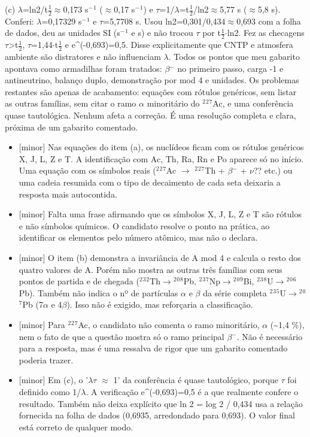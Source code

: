 \documentclass{article}%
\begin{document}
\newline%
(c) $\lambda$=ln2/t$\frac12$$\approx$0,173 s$^{-}$$^{1}$ ($\approx$0,17 s$^{-}$$^{1}$) e $\tau$=1/$\lambda$=t$\frac12$/ln2$\approx$5,77 s ($\approx$5,8 s). Conferi: $\lambda$=0,17329 s$^{-}$$^{1}$ e $\tau$=5,7708 s. Usou ln2=0,301/0,434$\approx$0,693 com a folha de dados, deu as unidades SI (s$^{-}$$^{1}$ e s) e não trocou $\tau$ por t$\frac12$$\cdot$ln2. Fez as checagens $\tau$>t$\frac12$, $\tau$=1,44$\cdot$t$\frac12$ e e\^{}(-0,693)=0,5. Disse explicitamente que CNTP e atmosfera ambiente são distratores e não influenciam $\lambda$.\newline%
\newline%
Todos os pontos que meu gabarito apontava como armadilhas foram tratados: $\beta$$^{-}$ no primeiro passo, carga -1 e antineutrino, balanço duplo, demonstração por mod 4 e unidades. Os problemas restantes são apenas de acabamento: equações com rótulos genéricos, sem listar as outras famílias, sem citar o ramo $\alpha$ minoritário do $^2$$^2$$^{7}$Ac, e uma conferência quase tautológica. Nenhum afeta a correção. É uma resolução completa e clara, próxima de um gabarito comentado.%
\begin{itemize}%
\item%
{[}minor{]} Nas equações do item (a), os nuclídeos ficam com os rótulos genéricos X, J, L, Z e T. A identificação com Ac, Th, Ra, Rn e Po aparece só no início. Uma equação com os símbolos reais ($^2$$^2$$^{7}$Ac $\to$ $^2$$^2$$^{7}$Th + $\beta$$^{-}$ + $\nu$?? etc.) ou uma cadeia resumida com o tipo de decaimento de cada seta deixaria a resposta mais autocontida.%
\item%
{[}minor{]} Falta uma frase afirmando que os símbolos X, J, L, Z e T são rótulos e não símbolos químicos. O candidato resolve o ponto na prática, ao identificar os elementos pelo número atômico, mas não o declara.%
\item%
{[}minor{]} O item (b) demonstra a invariância de A mod 4 e calcula o resto dos quatro valores de A. Porém não mostra as outras três famílias com seus pontos de partida e de chegada ($^2$$^3$$^2$Th$\to$$^2$$^{0}$$^{8}$Pb, $^2$$^3$$^{7}$Np$\to$$^2$$^{0}$$^{9}$Bi, $^2$$^3$$^{8}$U$\to$$^2$$^{0}$$^{6}$Pb). Também não indica o nº de partículas $\alpha$ e $\beta$ da série completa $^2$$^3$$^{5}$U$\to$$^2$$^{0}$$^{7}$Pb (7$\alpha$ e 4$\beta$). Isso não é exigido, mas reforçaria a classificação.%
\item%
{[}minor{]} Para $^2$$^2$$^{7}$Ac, o candidato não comenta o ramo minoritário, $\alpha$ (\textasciitilde{}1,4 \%), nem o fato de que a questão mostra só o ramo principal $\beta$$^{-}$. Não é necessário para a resposta, mas é uma ressalva de rigor que um gabarito comentado poderia trazer.%
\item%
{[}minor{]} Em (c), o '$\lambda$$\tau$ $\approx$ 1' da conferência é quase tautológico, porque $\tau$ foi definido como 1/$\lambda$. A verificação e\^{}(-0,693)=0,5 é a que realmente confere o resultado. Também não deixa explícito que ln 2 = log 2 / 0,434 usa a relação fornecida na folha de dados (0,6935, arredondado para 0,693). O valor final está correto de qualquer modo.%
\end{itemize}%
\end{document}
